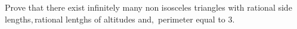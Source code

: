 Prove that there exist infinitely many non isosceles triangles with rational side lengths$,$rational lentghs of altitudes and$,$ perimeter equal to $3.$
